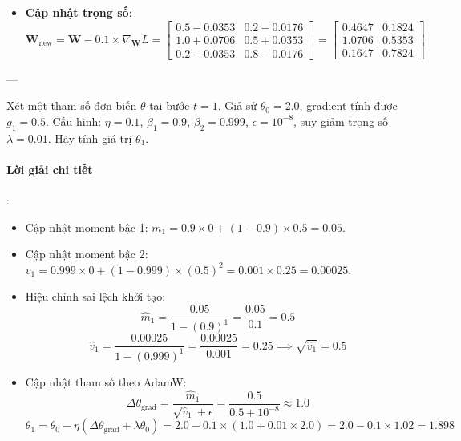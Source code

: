\begin{itemize}
  \item[3)] \textbf{Cập nhật trọng số}:
  \begin{equation*}
  \mathbf{W}_{\text{new}} = \mathbf{W} - 0.1 \times \nabla_\mathbf{W} L = \begin{bmatrix} 0.5 - 0.0353 & 0.2 - 0.0176 \\ 1.0 + 0.0706 & 0.5 + 0.0353 \\ 0.2 - 0.0353 & 0.8 - 0.0176 \end{bmatrix} = \begin{bmatrix} 0.4647 & 0.1824 \\ 1.0706 & 0.5353 \\ 0.1647 & 0.7824 \end{bmatrix}
  \end{equation*}
\end{itemize}

---

\begin{example}
Xét một tham số đơn biến $\theta$ tại bước $t=1$.
Giả sử $\theta_0 = 2.0$, gradient tính được $g_1 = 0.5$.
Cấu hình: $\eta = 0.1$, $\beta_1 = 0.9$, $\beta_2 = 0.999$, $\epsilon = 10^{-8}$, suy giảm trọng số $\lambda = 0.01$.
Hãy tính giá trị $\theta_1$.
\end{example}

\paragraph{Lời giải chi tiết}:
\begin{itemize}
  \item[1)] Cập nhật moment bậc 1: $m_1 = 0.9 \times 0 + (1 - 0.9) \times 0.5 = 0.05$.
  \item[2)] Cập nhật moment bậc 2: $v_1 = 0.999 \times 0 + (1 - 0.999) \times (0.5)^2 = 0.001 \times 0.25 = 0.00025$.
  \item[3)] Hiệu chỉnh sai lệch khởi tạo:
  \begin{equation*}
  \hat{m}_1 = \frac{0.05}{1 - (0.9)^1} = \frac{0.05}{0.1} = 0.5
  \end{equation*}
  \begin{equation*}
  \hat{v}_1 = \frac{0.00025}{1 - (0.999)^1} = \frac{0.00025}{0.001} = 0.25 \implies \sqrt{\hat{v}_1} = 0.5
  \end{equation*}
  \item[4)] Cập nhật tham số theo AdamW:
  \begin{equation*}
  \Delta \theta_{\text{grad}} = \frac{\hat{m}_1}{\sqrt{\hat{v}_1} + \epsilon} = \frac{0.5}{0.5 + 10^{-8}} \approx 1.0
  \end{equation*}
  \begin{equation*}
  \theta_1 = \theta_0 - \eta (\Delta \theta_{\text{grad}} + \lambda \theta_0) = 2.0 - 0.1 \times (1.0 + 0.01 \times 2.0) = 2.0 - 0.1 \times 1.02 = 1.898
  \end{equation*}
\end{itemize}

